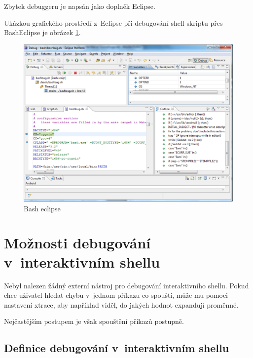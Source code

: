 \documentclass[thesis=M,czech]{FITthesis}[2012/06/26]
\begin{document}
Zbytek debuggeru je napsán jako doplněk Eclipse.

Ukázkou grafického prostředí z~Eclipse při debugování shell skriptu přes BashEclipse je obrázek \ref{fig:bash_eclipse}.

\begin{figure}
	\includegraphics[width=1.0\textwidth]{./images/bash_eclipse}
	\caption{Bash eclipse}
	\label{fig:bash_eclipse}
\end{figure}





%
%
%
%
%
\section{Možnosti debugování v~interaktivním shellu}

Nebyl nalezen žádný externí nástroj pro debugování interaktivního shellu. Pokud chce uživatel hledat chybu v~jednom příkazu co spouští, může mu pomoci nastavení xtrace, aby například viděl, do jakých hodnot expandují proměnné.

Nejčastějším postupem je však spouštění příkazů postupně.

%
%
\subsection{Definice debugování v~interaktivním shellu}
\end{document}

